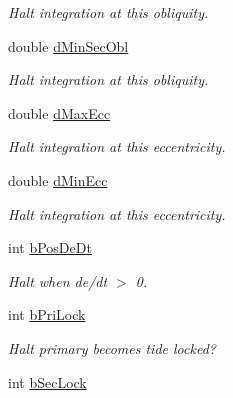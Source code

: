 \begin{DoxyCompactItemize}
\begin{DoxyCompactList}\small\item\em Halt integration at this obliquity. \end{DoxyCompactList}\item 
\hypertarget{struct_h_a_l_t_aa98b1c7f3248fc9c1df1138e7b7070b6}{}double \hyperlink{struct_h_a_l_t_aa98b1c7f3248fc9c1df1138e7b7070b6}{d\+Min\+Sec\+Obl}\label{struct_h_a_l_t_aa98b1c7f3248fc9c1df1138e7b7070b6}

\begin{DoxyCompactList}\small\item\em Halt integration at this obliquity. \end{DoxyCompactList}\item 
\hypertarget{struct_h_a_l_t_a5e2ba74f75a70ff34465b3f102f0ebc6}{}double \hyperlink{struct_h_a_l_t_a5e2ba74f75a70ff34465b3f102f0ebc6}{d\+Max\+Ecc}\label{struct_h_a_l_t_a5e2ba74f75a70ff34465b3f102f0ebc6}

\begin{DoxyCompactList}\small\item\em Halt integration at this eccentricity. \end{DoxyCompactList}\item 
\hypertarget{struct_h_a_l_t_a6d138443586e195a5f47deca733f4fc6}{}double \hyperlink{struct_h_a_l_t_a6d138443586e195a5f47deca733f4fc6}{d\+Min\+Ecc}\label{struct_h_a_l_t_a6d138443586e195a5f47deca733f4fc6}

\begin{DoxyCompactList}\small\item\em Halt integration at this eccentricity. \end{DoxyCompactList}\item 
\hypertarget{struct_h_a_l_t_ae5bd58c5d145b7fa7ebbdec7ad5b5580}{}int \hyperlink{struct_h_a_l_t_ae5bd58c5d145b7fa7ebbdec7ad5b5580}{b\+Pos\+De\+Dt}\label{struct_h_a_l_t_ae5bd58c5d145b7fa7ebbdec7ad5b5580}

\begin{DoxyCompactList}\small\item\em Halt when de/dt $>$ 0. \end{DoxyCompactList}\item 
\hypertarget{struct_h_a_l_t_a825eeb134179c421278c53f6ac05a26c}{}int \hyperlink{struct_h_a_l_t_a825eeb134179c421278c53f6ac05a26c}{b\+Pri\+Lock}\label{struct_h_a_l_t_a825eeb134179c421278c53f6ac05a26c}

\begin{DoxyCompactList}\small\item\em Halt primary becomes tide locked? \end{DoxyCompactList}\item 
\hypertarget{struct_h_a_l_t_a9994987c28a22810da5fef8a42601d7b}{}int \hyperlink{struct_h_a_l_t_a9994987c28a22810da5fef8a42601d7b}{b\+Sec\+Lock}\label{struct_h_a_l_t_a9994987c28a22810da5fef8a42601d7b}


\end{DoxyCompactItemize}
